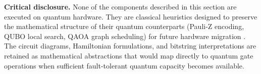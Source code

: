 \textbf{Critical disclosure.} None of the components described in this section are executed on quantum hardware. They are classical heuristics designed to preserve the mathematical structure of their quantum counterparts (Pauli-Z encoding, QUBO local search, QAOA graph scheduling) for future hardware migration \cite{Blekos2024, Preskill2018}. The circuit diagrams, Hamiltonian formulations, and bitstring interpretations are retained as mathematical abstractions that would map directly to quantum gate operations when sufficient fault-tolerant quantum capacity becomes available.
